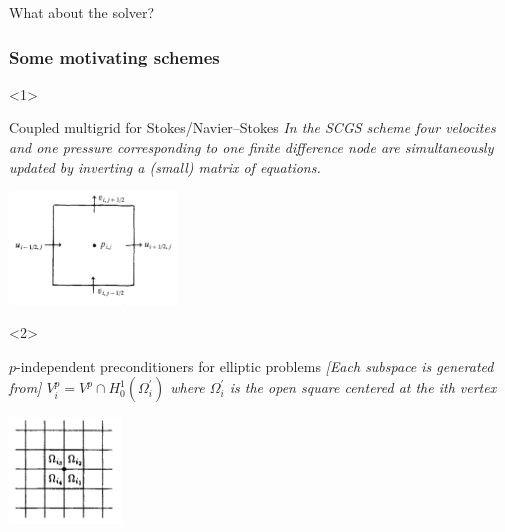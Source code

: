 \documentclass[presentation,aspectratio=43, 10pt]{beamer}
\begin{document}
\begin{frame}[standout]
  What about the solver?
\end{frame}

\begin{frame}[t]
  \frametitle{Some motivating schemes}
  \begin{onlyenv}<1>
    \begin{block}{Coupled multigrid for Stokes/Navier--Stokes}
      \emph{In the SCGS scheme four velocites and one pressure
      corresponding to one finite difference node are simultaneously
      updated by inverting a (small) matrix of equations.}

      \begin{center}
        \includegraphics[height=3cm]{vanka}
      \end{center}
      {\hfill \textcite{Vanka:1986}}
    \end{block}
  \end{onlyenv}
  \begin{onlyenv}<2>
    \begin{block}{$p$-independent preconditioners for elliptic problems}
      \emph{[Each subspace is generated from]
      $V_i^p = V^p \cap H^1_0(\Omega_i^{'})$ where $\Omega_i^{'}$ is the open square
      centered at the ith vertex}
      \begin{center}
        \includegraphics[width=3cm]{pavarino}
      \end{center}
      {\hfill \textcite{Pavarino:1993}}
    \end{block}
  \end{onlyenv}


\end{frame}
\end{document}
